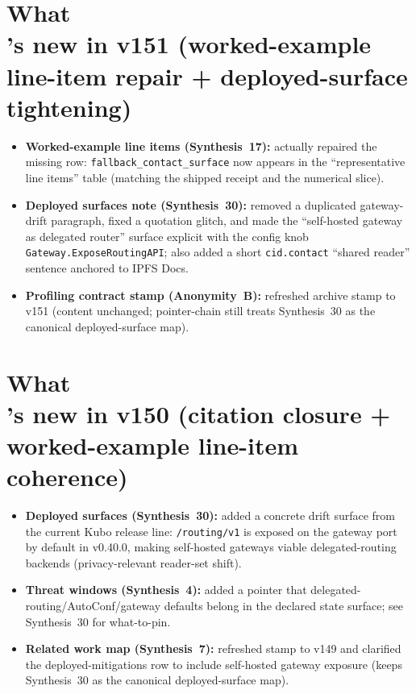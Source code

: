 \documentclass[11pt]{article}
\begin{document}
\section{What\\'s new in v151 (worked-example line-item repair + deployed-surface tightening)}
\begin{itemize}[leftmargin=*]
\item \textbf{Worked-example line items (Synthesis~17):} actually repaired the missing row: \texttt{fallback\_contact\_surface} now appears in the ``representative line items'' table (matching the shipped receipt and the numerical slice).
\item \textbf{Deployed surfaces note (Synthesis~30):} removed a duplicated gateway-drift paragraph, fixed a quotation glitch, and made the ``self-hosted gateway as delegated router'' surface explicit with the config knob \texttt{Gateway.ExposeRoutingAPI}; also added a short \texttt{cid.contact} ``shared reader'' sentence anchored to IPFS Docs.
\item \textbf{Profiling contract stamp (Anonymity~B):} refreshed archive stamp to v151 (content unchanged; pointer-chain still treats Synthesis~30 as the canonical deployed-surface map).
\end{itemize}

\section{What\\'s new in v150 (citation closure + worked-example line-item coherence)}
\begin{itemize}[leftmargin=*]
\item \textbf{Deployed surfaces (Synthesis~30):} added a concrete drift surface from the current Kubo release line: \texttt{/routing/v1} is exposed on the gateway port by default in v0.40.0, making self-hosted gateways viable delegated-routing backends (privacy-relevant reader-set shift).
\item \textbf{Threat windows (Synthesis~4):} added a pointer that delegated-routing/AutoConf/gateway defaults belong in the declared state surface; see Synthesis~30 for what-to-pin.
\item \textbf{Related work map (Synthesis~7):} refreshed stamp to v149 and clarified the deployed-mitigations row to include self-hosted gateway exposure (keeps Synthesis~30 as the canonical deployed-surface map).
\end{itemize}
\end{document}
